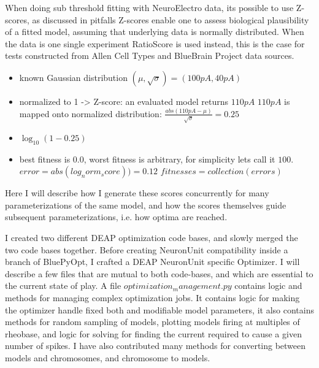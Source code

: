 When doing sub threshold fitting with NeuroElectro data, its possible to use Z-scores, as discussed in pitfalls Z-scores enable one to assess biological plausibility of a fitted model, assuming that underlying data is normally distributed.  When the data is one single experiment RatioScore is used instead, this is the case for tests constructed from Allen Cell Types and BlueBrain Project data sources.

\begin{itemize}
    \item known Gaussian distribution $(\mu, \sqrt{\sigma}) = (100pA, 40pA)$
    \item normalized to 1 -> Z-score: 
        \subitem an evaluated model returns $110pA$ 
        \subitem $110pA$ is mapped onto normalized distribution: $\frac{abs(110pA-\mu)}{\sqrt{\sigma}} = 0.25$
    \item $\log_{10}(1-0.25) $ 
    \item best fitness is 0.0, worst fitness is arbitrary, for simplicity lets call it $100$.
        \subitem  $ error = abs(log_norm_score)) = 0.12$ 
        \subitem $ fitnesses = collection(errors) $
\end{itemize}

Here I will describe how I generate these scores concurrently for many parameterizations of the same model, and how the scores themselves guide subsequent parameterizations, i.e. how optima are reached.

I created two different DEAP optimization code bases, and slowly merged the two code bases together. Before creating NeuronUnit compatibility inside a branch of BluePyOpt, I crafted a DEAP NeuronUnit specific Optimizer. I will describe a few files that are mutual to both code-bases, and which are essential to the current state of play. A file $optimization_management.py$ contains logic and methods for managing complex optimization jobs. It contains logic for making the optimizer handle fixed both and modifiable model parameters, it also contains methods for random sampling of models, plotting models firing at multiples of rheobase, and logic for solving for finding the current required to cause a given number of spikes. I have also contributed many methods for converting between models and chromosomes, and chromosome to models.

